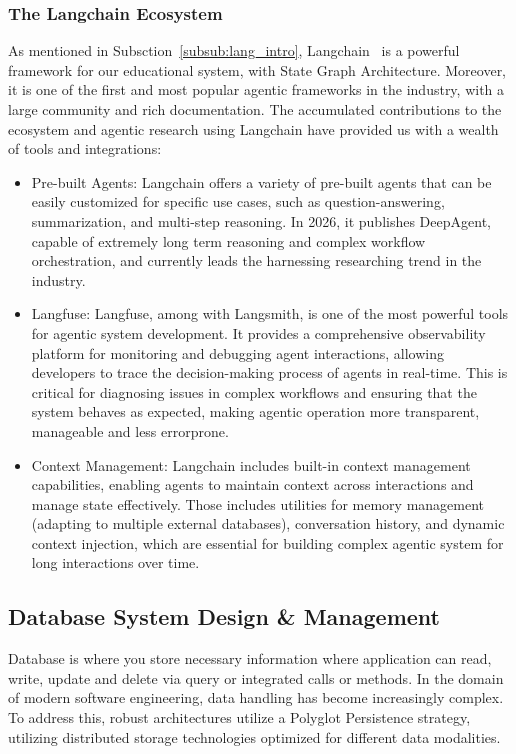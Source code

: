 \subsubsection*{The Langchain Ecosystem}
As mentioned in Subsction~\ref{subsub:lang_intro}, Langchain~\cite{LangChain} is a powerful framework for our educational system, with State Graph Architecture. Moreover, it is one of the first and most popular agentic 
frameworks in the industry, with a large community and rich documentation. The accumulated contributions to the ecosystem and agentic research using Langchain have provided 
us with a wealth of tools and integrations:
\begin{itemize}
    \item {Pre-built Agents:} Langchain offers a variety of pre-built agents that can be easily customized for specific use cases, such as question-answering, 
    summarization, and multi-step reasoning. In 2026, it publishes DeepAgent, capable of extremely long term reasoning and complex workflow orchestration, 
    and currently leads the harnessing researching trend in the industry.
    \item {Langfuse:} Langfuse, among with Langsmith, is one of the most powerful tools for agentic system development. It provides a comprehensive observability platform for monitoring 
    and debugging agent interactions, allowing developers to trace the decision-making process of agents in real-time. This is critical for diagnosing issues in 
    complex workflows and ensuring that the system behaves as expected, making agentic operation more transparent, manageable and less error\-prone. 
    \item {Context Management:} Langchain includes built-in context management capabilities, enabling agents to maintain context across interactions and manage state effectively.
    Those includes utilities for memory management (adapting to multiple external databases), conversation history, and dynamic context injection, which are essential 
    for building complex agentic system for long interactions over time.
\end{itemize}




\subsection{Database System Design \& Management}
Database is where you store necessary information where application can read, write, update and delete via query or integrated calls or methods. In the domain of modern software 
engineering, data handling has become increasingly complex. To address this, robust architectures utilize a Polyglot Persistence strategy, utilizing distributed 
storage technologies optimized for different data modalities.

